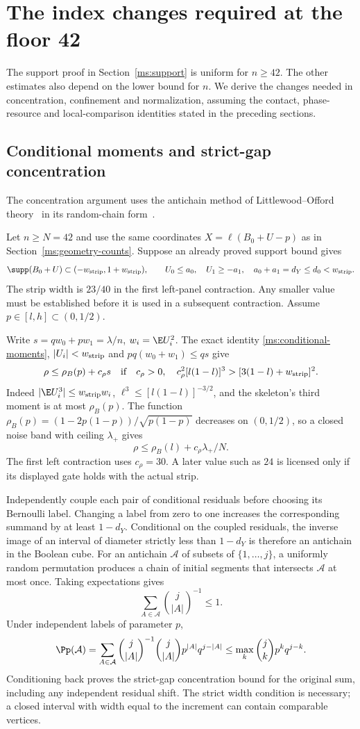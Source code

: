 \section{The index changes required at the floor 42}\label{ms:uniform-bridge}

The support proof in Section~\ref{ms:support} is uniform for $n\ge42$.
The other estimates also depend on the lower bound for $n$. We derive
the changes needed in concentration, confinement and normalization,
assuming the contact, phase-resource and local-comparison identities
stated in the preceding sections.

\subsection{Conditional moments and strict-gap concentration}
The concentration argument uses the antichain method of
Littlewood--Offord theory~\cite{Erdos1945} in its random-chain
form~\cite{Lubell1966}.

Let $n\ge N=42$ and use the same coordinates
$X=\ell(B_0+U-p)$ as in Section~\ref{ms:geometry-counts}. Suppose an
already proved support bound gives
\[
 \supp(B_0+U)\subset(-w_{\rm strip},1+w_{\rm strip}),\qquad
 U_0\le a_0,\quad U_1\ge-a_1,\quad
 a_0+a_1=d_Y\le d_0<w_{\rm strip}.
\]
The strip width is $23/40$ in the first left-panel contraction.
Any smaller value must be established before it is used in a subsequent
contraction. Assume $p\in[l,h]\subset(0,1/2)$.

Write $s=qw_0+pw_1=\lambda/n$, $w_i=\E U_i^2$. The exact identity
\eqref{ms:conditional-moments}, $|U_i|<w_{\rm strip}$ and $pq(w_0+w_1)\le qs$
give
\[
 \rho\le\rho_B(p)+c_\rho s
 \quad\hbox{if}\quad
 c_\rho>0,\quad c_\rho^2[l(1-l)]^3>[3(1-l)+w_{\rm strip}]^2.
\]
Indeed $|\E U_i^3|\le w_{\rm strip} w_i$,
$\ell^3\le[l(1-l)]^{-3/2}$, and the skeleton's third moment is at
most $\rho_B(p)$. The function $\rho_B(p)=(1-2p(1-p))/\sqrt{p(1-p)}$
decreases on $(0,1/2)$, so a closed noise band with ceiling
$\lambda_+$ gives
\[
 \rho\le\rho_B(l)+c_\rho\lambda_+/N.
\]
The first left contraction uses $c_\rho=30$. A later value such as $24$
is licensed only if its displayed gate holds with the actual strip.

Independently couple each pair of conditional residuals before choosing
its Bernoulli label. Changing a label from zero to one increases the
corresponding summand by at least $1-d_Y$. Conditional on the coupled
residuals, the inverse image of an interval of diameter strictly less
than $1-d_Y$ is therefore an antichain in the Boolean cube. For an
antichain $\mathcal A$ of subsets of $\{1,\ldots,j\}$, a uniformly
random permutation produces a chain of initial segments that intersects
$\mathcal A$ at most once. Taking expectations gives
\[
 \sum_{A\in\mathcal A}\binom{j}{|A|}^{-1}\le1.
\]
Under independent labels of parameter $p$,
\[
 \Pp(\mathcal A)=\sum_{A\in\mathcal A}
 \binom{j}{|A|}^{-1}\binom{j}{|A|}p^{|A|}q^{j-|A|}
 \le\max_k\binom jk p^kq^{j-k}.
\]
Conditioning back proves the strict-gap concentration bound for the
original sum, including any independent residual shift. The strict
width condition is necessary; a closed interval with width equal to the
increment can contain comparable vertices.

